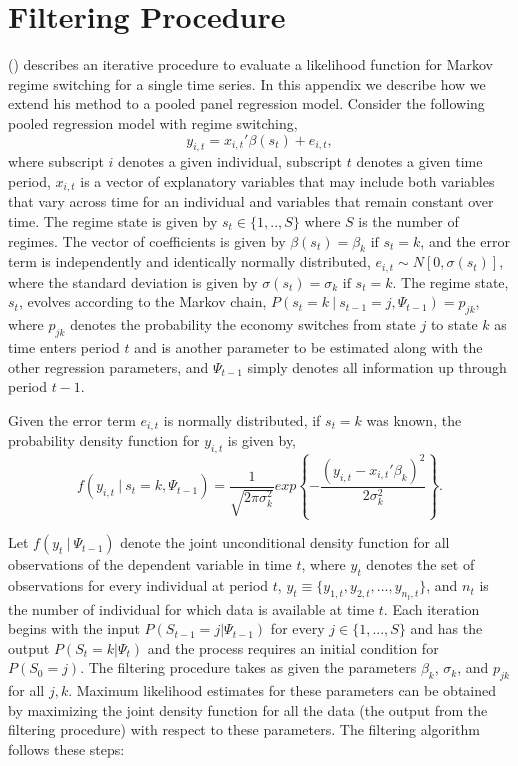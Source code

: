 \documentclass[12pt]{article}
\newcommand{\beq}{\begin{equation}}
\newcommand{\eeq}{\end{equation}}
\newcommand{\citee}[1]{\citename{#1} (\citeyear{#1})}
\newcommand{\appsection}[1]
{
\section{#1}
\renewcommand{\theequation}{\thesection\arabic{equation}}
\setcounter{equation}{0}
}
\begin{document}
\appendix
\appsection{Filtering Procedure}\label{s:afilter}

\citee{hamilton1989} describes an iterative procedure to evaluate a likelihood function for Markov regime switching for a single time series.  In this appendix we describe how we extend his method to a pooled panel regression model.  Consider the following pooled regression model with regime switching,
\beq y_{i,t} = x_{i,t}'\beta(s_t) + e_{i,t}, \eeq
where subscript $i$ denotes a given individual, subscript $t$ denotes a given time period, $x_{i,t}$ is a vector of explanatory variables that may include both variables that vary across time for an individual and variables that remain constant over time.  The regime state is given by $s_t \in \{1,..,S\}$ where $S$ is the number of regimes.  The vector of coefficients is given by $\beta(s_t) = \beta_k \mbox{ if } s_t=k$, and the error term is independently and identically normally distributed, $e_{i,t} \sim N[0, \sigma(s_t)]$, where the standard deviation is given by $\sigma(s_t) = \sigma_k \mbox{ if } s_t=k$.  The regime state, $s_t$, evolves according to the Markov chain, $P(s_t=k~|~s_{t-1}=j, \Psi_{t-1}) = p_{jk}$, where $p_{jk}$ denotes the probability the economy switches from state $j$ to state $k$ as time enters period $t$ and is another parameter to be estimated along with the other regression parameters, and $\Psi_{t-1}$ simply denotes all information up through period $t-1$.

Given the error term $e_{i,t}$ is normally distributed, if $s_t=k$ was known, the probability density function for $y_{i,t}$ is given by,
\beq \label{eq:fyit} f(y_{i,t}~|~s_t=k, \Psi_{t-1}) = \frac{1}{\sqrt{2\pi\sigma_k^2}} exp \left\{ - \frac{\left(y_{i,t} - x_{i,t}'\beta_k\right)^2}{2 \sigma_k^2} \right\}. \eeq

Let $f(y_{t} ~|~ \Psi_{t-1})$ denote the joint unconditional density function for all observations of the dependent variable in time $t$, where $y_t$ denotes the set of observations for every individual at period $t$, $y_t \equiv \{y_{1,t}, y_{2,t}, ..., y_{n_t,t}\}$, and $n_t$ is the number of individual for which data is available at time $t$.  Each iteration begins with the input $P(S_{t-1}=j | \Psi_{t-1})$ for every $j\in\{1,...,S\}$ and has the output $P(S_t=k | \Psi_t)$ and the process requires an initial condition for $P(S_0=j)$.  The filtering procedure takes as given the parameters $\beta_k$, $\sigma_k$, and $p_{jk}$ for all $j,k$.  Maximum likelihood estimates for these parameters can be obtained by maximizing the joint density function for all the data (the output from the filtering procedure) with respect to these parameters.  The filtering algorithm follows these steps:
\end{document}
